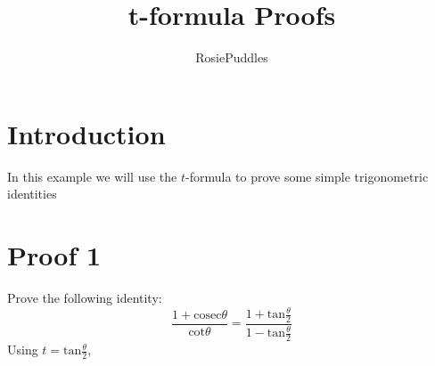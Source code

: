\documentclass{article}
\title{t-formula Proofs}
\date{}
\author{RosiePuddles}
\begin{document}
\maketitle
\section{Introduction}In this example we will use the $t$-formula to prove some simple trigonometric identities 
\section{Proof 1}Prove the following identity: 
\begin{equation}
\frac{1+\mathrm{cosec}\theta}{\mathrm{cot}\theta}=\frac{1+\mathrm{tan}\frac\theta 2}{1-\mathrm{tan}\frac\theta 2}\end{equation}
Using $t=\mathrm{tan}\frac\theta 2$, 
\end{document}
